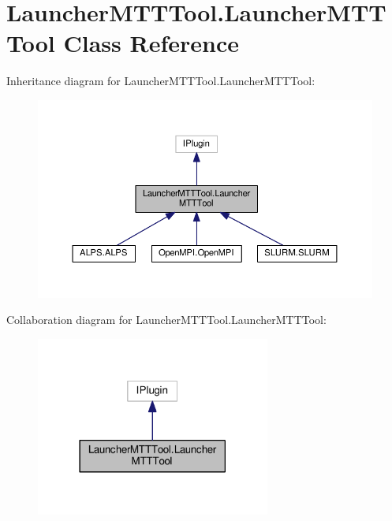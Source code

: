 \hypertarget{class_launcher_m_t_t_tool_1_1_launcher_m_t_t_tool}{\section{Launcher\-M\-T\-T\-Tool.\-Launcher\-M\-T\-T\-Tool Class Reference}
\label{class_launcher_m_t_t_tool_1_1_launcher_m_t_t_tool}
}


Inheritance diagram for Launcher\-M\-T\-T\-Tool.\-Launcher\-M\-T\-T\-Tool\-:
\nopagebreak
\begin{figure}[H]
\begin{center}
\leavevmode
\includegraphics[width=350pt]{class_launcher_m_t_t_tool_1_1_launcher_m_t_t_tool__inherit__graph}
\end{center}
\end{figure}


Collaboration diagram for Launcher\-M\-T\-T\-Tool.\-Launcher\-M\-T\-T\-Tool\-:
\nopagebreak
\begin{figure}[H]
\begin{center}
\leavevmode
\includegraphics[width=218pt]{class_launcher_m_t_t_tool_1_1_launcher_m_t_t_tool__coll__graph}
\end{center}
\end{figure}
